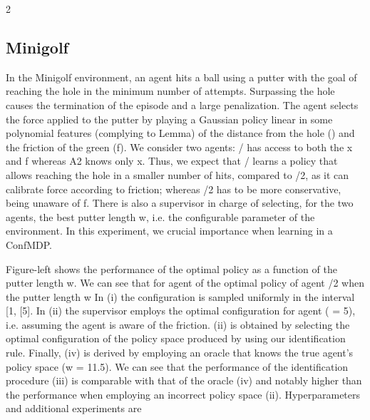 \documentclass{article}
\begin{document}
\begin{paracol}{2}
\subsection*{Minigolf}


In the Minigolf environment, an agent hits a ball using a putter with the goal of reaching the hole in the minimum number of attempts. Surpassing the hole causes the termination
of the episode and a large penalization. The agent selects the
force applied to the putter by playing a Gaussian policy linear in some polynomial features (complying to Lemma) of
the distance from the hole () and the friction of the green
(f). We consider two agents: / has access to both the x and
f whereas A2 knows only x. Thus, we expect that / learns
a policy that allows reaching the hole in a smaller number of
hits, compared to /2, as it can calibrate force according to
friction; whereas /2 has to be more conservative, being unaware of f. There is also a supervisor in charge of selecting,
for the two agents, the best putter length w, i.e. the configurable parameter of the environment. In this experiment, we
crucial importance when learning in a ConfMDP.


Figure-left shows the performance of the optimal policy
as a function of the putter length w. We can see that for agent
of the optimal policy of agent /2 when the putter length w
In (i) the configuration is sampled uniformly in the interval
[1, [5]. In (ii) the supervisor employs the optimal configuration for agent  ( = 5), i.e. assuming the agent is aware
of the friction. (ii) is obtained by selecting the optimal configuration of the policy space produced by using our identification rule. Finally, (iv) is derived by employing an oracle
that knows the true agent's policy space (w = 11.5). We can
see that the performance of the identification procedure (iii)
is comparable with that of the oracle (iv) and notably higher
than the performance when employing an incorrect policy
space (ii). Hyperparameters and additional experiments are

\end{paracol}
\end{document}
